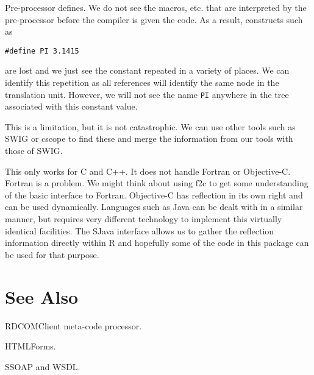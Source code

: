 \documentclass{article}
\begin{document}
\item Pre-processor defines.
We do not see the macros, etc. that are interpreted by the 
pre-processor before the compiler is given the code.
As a result, constructs such as
\begin{verbatim}
#define PI 3.1415
\end{verbatim}
are lost and we just see the constant repeated
in a variety of places.
We can identify this repetition as all references
will identify the same node in the translation unit.
However, we will not see the name 
\verb+PI+ anywhere in the tree associated with this 
constant value.

This is a limitation, but it is not catastrophic. 
We can use other tools such as SWIG or cscope to find these
and merge the information from our tools
with those of SWIG. 


\item This only works for C and C++. It
does not handle Fortran or Objective-C.
Fortran is a problem. We might think about
using f2c to get some understanding of the
basic interface to Fortran.
Objective-C has reflection in its own right
and can be used dynamically.
Languages such as Java can be dealt with in
a similar manner, but requires very different 
technology to implement this virtually identical
facilities.
The SJava  interface
allows us to gather the reflection information 
directly within R and hopefully some of the 
code in this package can be used for that purpose.




\section{See Also}
RDCOMClient meta-code processor.

HTMLForms.

SSOAP and WSDL.
\end{document}
